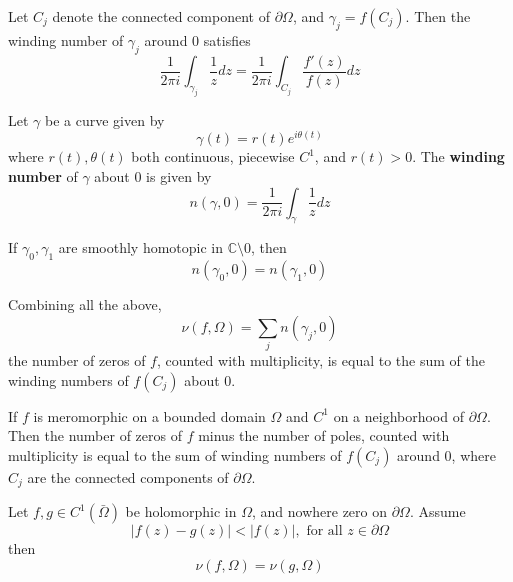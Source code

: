 \documentclass[openany]{book}
\newcommand{\C}{\mathbb{C}}
\begin{document}
\begin{prop}
    Let $C_j$ denote the connected component of $\partial\Omega$, and $\gamma_j=f(C_j)$. Then the winding number of $\gamma_j$ around $0$ satisfies
    \begin{equation*}
        \frac{1}{2\pi i}\int_{\gamma_j}\frac{1}{z}dz=\frac{1}{2\pi i}\int_{C_j}\frac{f'(z)}{f(z)}dz
    \end{equation*}
\end{prop}

\begin{defn}
    Let $\gamma$ be a curve given by 
    \begin{equation*}
        \gamma(t)=r(t)e^{i\theta(t)}
    \end{equation*}
    where $r(t),\theta(t)$ both continuous, piecewise $C^1$, and $r(t)>0$. The \textbf{winding number} of $\gamma$ about $0$ is given by 
    \begin{equation*}
        n(\gamma,0)=\frac{1}{2\pi i}\int_\gamma\frac{1}{z}dz
    \end{equation*}
\end{defn}

\begin{prop}
    If $\gamma_0,\gamma_1$ are smoothly homotopic in $\C\setminus 0$, then 
    \begin{equation*}
        n(\gamma_0,0)=n(\gamma_1,0)
    \end{equation*}
\end{prop}
Combining all the above,
\begin{equation*}
    \nu(f,\Omega)=\sum_j n(\gamma_j, 0)
\end{equation*}
the number of zeros of $f$, counted with multiplicity, is equal to the sum of the winding numbers of $f(C_j)$ about $0$.
\begin{prop}
    If $f$ is meromorphic on a bounded domain $\Omega$ and $C^1$ on a neighborhood of $\partial\Omega$. Then the number of zeros of $f$ minus the number of poles, counted with multiplicity is equal to the sum of winding numbers of $f(C_j)$ around 0, where $C_j$ are the connected components of $\partial\Omega$.
\end{prop}

\begin{thm}
    Let $f,g\in C^1(\bar{\Omega})$ be holomorphic in $\Omega$, and nowhere zero on $\partial\Omega$. Assume 
    \begin{equation*}
        |f(z)-g(z)|<|f(z)|, \text{ for all } z\in\partial\Omega
    \end{equation*}
    then 
    \begin{equation*}
        \nu(f,\Omega)=\nu(g,\Omega)
    \end{equation*}
\end{thm}
\end{document}
